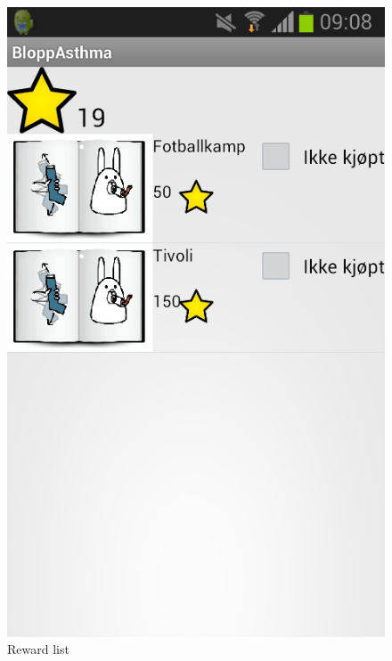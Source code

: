 \begin{figure}
\begin{minipage}[b]{0.3\linewidth}
		\includegraphics[width=0.20\paperwidth]{Pictures/app-screenshots/reward-list.png}
		\caption{Reward list}
		\label{fig:reward-list}
	\end{minipage}
	\begin{minipage}[b]{0.3\linewidth}
		\centering

\end{minipage}
\end{figure}
